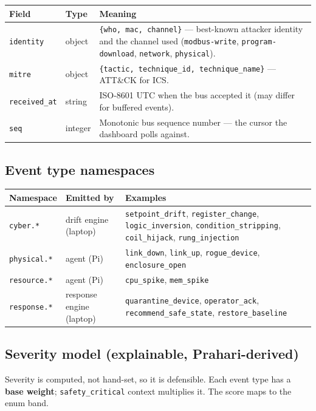 \documentclass[11pt,a4paper]{article}
\newcommand{\code}[1]{\texttt{\small #1}}
\begin{document}
\begin{tabularx}{\textwidth}{@{}p{2.3cm} p{2.2cm} L@{}}
\toprule
\textbf{Field} & \textbf{Type} & \textbf{Meaning} \\
\midrule
\code{identity} & object & \code{\{who, mac, channel\}} --- best-known attacker identity and the channel used
  (\code{modbus-write}, \code{program-download}, \code{network}, \code{physical}). \\
\code{mitre} & object & \code{\{tactic, technique\_id, technique\_name\}} --- ATT\&CK for ICS. \\
\code{received\_at} & string & ISO-8601 UTC when the bus accepted it (may differ for buffered events). \\
\code{seq} & integer & Monotonic bus sequence number --- the cursor the dashboard polls against. \\
\bottomrule
\end{tabularx}

\subsection{Event type namespaces}
\begin{tabularx}{\textwidth}{@{}p{2.2cm} p{3.2cm} L@{}}
\toprule
\textbf{Namespace} & \textbf{Emitted by} & \textbf{Examples} \\
\midrule
\code{cyber.*} & drift engine (laptop) & \code{setpoint\_drift}, \code{register\_change},
  \code{logic\_inversion}, \code{condition\_stripping}, \code{coil\_hijack}, \code{rung\_injection} \\
\code{physical.*} & agent (Pi) & \code{link\_down}, \code{link\_up}, \code{rogue\_device}, \code{enclosure\_open} \\
\code{resource.*} & agent (Pi) & \code{cpu\_spike}, \code{mem\_spike} \\
\code{response.*} & response engine (laptop) & \code{quarantine\_device}, \code{operator\_ack},
  \code{recommend\_safe\_state}, \code{restore\_baseline} \\
\bottomrule
\end{tabularx}

\subsection{Severity model (explainable, Prahari-derived)}
Severity is computed, not hand-set, so it is defensible. Each event type has a \textbf{base weight};
\code{safety\_critical} context multiplies it. The score maps to the enum band.
\end{document}
